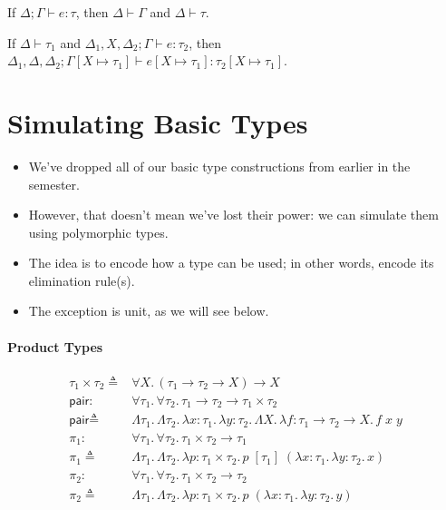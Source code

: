 \documentclass{lecturenotes}
\newcommand{\tabs}[3]{\ensuremath{\lambda #1 \colon #2.\,#3}}
\newcommand{\app}[2]{\ensuremath{#1\;#2}}
\newcommand{\utype}{\textsf{unit}\xspace}
\newcommand{\prodtype}[2]{\ensuremath{#1 \times #2}}
\newcommand{\fatype}[2]{\ensuremath{\forall #1.\,#2}}
\newcommand{\Abs}[2]{\Lambda #1.\,#2}
\newcommand{\App}[2]{#1\;[#2]}
\begin{document}
\begin{thm}
  If $\Delta; \Gamma \vdash e : \tau$, then $\Delta \vdash \Gamma$ and $\Delta \vdash \tau$.
\end{thm}

\begin{thm}
  If $\Delta \vdash \tau_1$ and $\Delta_1, X, \Delta_2; \Gamma \vdash e : \tau_2$, then $\Delta_1, \Delta, \Delta_2; \Gamma[X \mapsto \tau_1] \vdash e[X \mapsto \tau_1] : \tau_2[X \mapsto \tau_1]$.
\end{thm}

\section{Simulating Basic Types}
\label{sec:simul-basic-types}

\begin{itemize}
\item We've dropped all of our basic type constructions from earlier in the semester.
\item However, that doesn't mean we've lost their power: we can simulate them using polymorphic types.
\item The idea is to encode how a type can be used; in other words, encode its elimination rule(s).
\item The exception is \utype, as we will see below.
\end{itemize}

\newpage
\paragraph{Product Types}
$$
\begin{array}{rl}
  \prodtype{\tau_1}{\tau_2} \triangleq &\fatype{X}{(\tau_1 \to \tau_2 \to X) \to X}\\
  \textsf{pair} :& \fatype{\tau_1}{\fatype{\tau_2}{\tau_1 \to \tau_2 \to \tau_1 \times \tau_2}}\\
  \textsf{pair} \triangleq& \Abs{\tau_1}{\Abs{\tau_2}{\tabs{x}{\tau_1}{\tabs{y}{\tau_2}{\Abs{X}{\tabs{f}{\tau_1 \to \tau_2 \to X}{\app{\app{f}{x}}{y}}}}}}} \\
  \pi_1 :& \fatype{\tau_1}{\fatype{\tau_2}{\tau_1 \times \tau_2 \to \tau_1}}\\
  \pi_1 \triangleq& \Abs{\tau_1}{\Abs{\tau_2}{\tabs{p}{\tau_1 \times \tau_2}{\app{\App{p}{\tau_1}}{(\tabs{x}{\tau_1}{\tabs{y}{\tau_2}{x}})}}}}\\
  \pi_2 :& \fatype{\tau_1}{\fatype{\tau_2}{\tau_1 \times \tau_2 \to \tau_2}}\\
  \pi_2 \triangleq& \Abs{\tau_1}{\Abs{\tau_2}{\tabs{p}{\tau_1 \times \tau_2}{\app{p}{(\tabs{x}{\tau_1}{\tabs{y}{\tau_2}{y}})}}}}
\end{array}
$$
\end{document}

